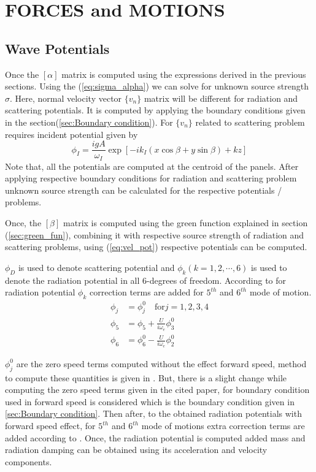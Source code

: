 \chapter{FORCES and MOTIONS}
\section{Wave Potentials}
Once the $[\alpha]$ matrix is computed using the expressions derived in the previous sections. Using
the (\ref{eq:sigma_alpha}) we can solve for unknown source strength $\sigma$. Here, normal velocity
vector $\{v_n\}$ matrix will be different for radiation and scattering potentials. It is computed by applying 
the boundary conditions given in the section(\ref{sec:Boundary condition}). For $\{v_n\}$ related to
scattering problem requires incident potential given by 
\begin{equation}
    \label{eq:incident_pot}
    \phi_I = \frac{igA}{\omega_I} \exp[-ik_I(x\cos \beta + y\sin \beta)+kz]
\end{equation}
Note that, all the potentials are computed at the centroid of the panels. After applying respective 
boundary conditions for radiation and scattering problem unknown source strength can be calculated for the 
respective potentials / problems.

Once, the $[\beta]$ matrix is computed using the green function explained in section (\ref{sec:green_fun}), 
combining it with respective source strength of radiation and scattering problems, using 
(\ref{eq:vel_pot}) respective potentials can be computed.

$\phi_D$ is used to denote scattering potential and $\phi_k (k=1, 2, \cdots, 6)$ is used to denote the 
radiation potential in all 6-degrees of freedom. According to \cite{salvesen1970ship} for radiation potential $\phi_k$ 
correction terms are added for $5^{th}$ and $6^{th}$ mode of motion.
\begin{align}
    \phi_j &= \phi^0_j \quad \text{for} j = 1, 2, 3, 4 \\ \nonumber 
    \phi_5 &= \phi_5 +\frac{U}{i\omega_e} \phi^0_3 \\ \nonumber 
    \phi_6 &= \phi^0_6 - \frac{U}{i\omega_e} \phi^0_2
\end{align}

$\phi^0_j$ are the zero speed terms computed without the effect forward speed, method to 
compute these quantities is given in \cite{guha2012development}. But, there is a slight change while
computing the zero speed terms given in the cited paper, for boundary condition used in
forward speed is considered which is the boundary condition given in \ref{sec:Boundary condition}.
Then after, to the obtained radiation potentials with forward speed effect,
for $5^{th}$ and $6^{th}$ mode of motions extra correction terms are added 
according to \cite{salvesen1970ship}. Once, the radiation potential is computed 
added mass and radiation damping can be obtained using its acceleration and velocity components.
